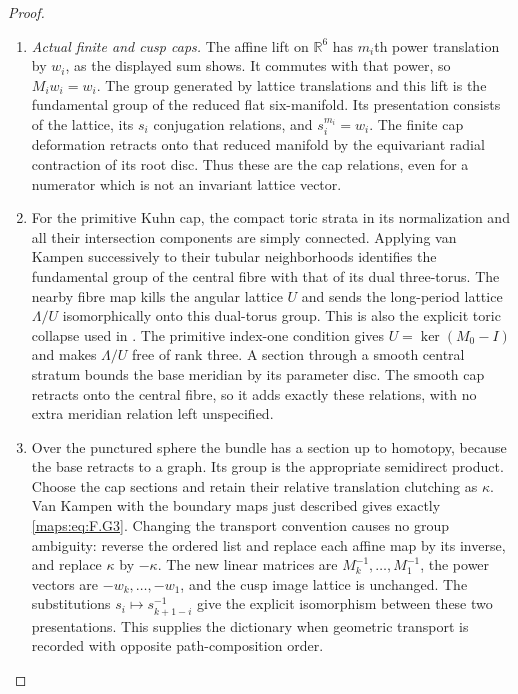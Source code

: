 \begin{proof}
\begin{enumerate}[label={$\langle1\rangle$\arabic*.}]
\item \emph{Actual finite and cusp caps.}
The affine lift on $\mathbb R^6$ has $m_i$th power translation by
$w_i$, as the displayed sum shows.  It commutes with that power,
so $M_iw_i=w_i$.  The group generated by lattice translations
and this lift is the fundamental group of the reduced flat
six-manifold.  Its presentation consists of the lattice, its
$s_i$ conjugation relations, and $s_i^{m_i}=w_i$.
The finite cap deformation retracts onto that reduced manifold
by the equivariant radial contraction of its root disc.
Thus these are the cap relations, even for a numerator
which is not an invariant lattice vector.

\item For the primitive Kuhn cap, the compact toric strata in its
normalization and all their intersection components are simply
connected.  Applying van Kampen successively to their tubular
neighborhoods identifies the fundamental group of the central
fibre with that of its dual three-torus.  The nearby fibre map
kills the angular lattice $U$ and sends the long-period lattice
$\Lambda/U$ isomorphically onto this dual-torus group.  This is
also the explicit toric collapse used in .  The primitive
index-one condition gives $U=\ker(M_0-I)$ and makes $\Lambda/U$
free of rank three.  A section through a smooth central stratum
bounds the base meridian by its parameter disc.  The smooth cap
retracts onto the central fibre, so it adds exactly these
relations, with no extra meridian relation left unspecified.

\item Over the punctured sphere the bundle has a section up to homotopy,
because the base retracts to a graph.  Its group is the appropriate
semidirect product.  Choose the cap sections and retain their
relative translation clutching as $\kappa$.  Van Kampen with the
boundary maps just described gives exactly \eqref{maps:eq:F.G3}.
Changing the transport convention causes no group ambiguity:
reverse the ordered list and replace each affine map by its
inverse, and replace $\kappa$ by $-\kappa$.  The new linear
matrices are $M_k^{-1},\ldots,M_1^{-1}$, the power vectors are
$-w_k,\ldots,-w_1$, and the cusp image lattice is unchanged.
The substitutions $s_i\mapsto s_{k+1-i}^{-1}$ give the explicit
isomorphism between these two presentations.  This supplies the
dictionary when geometric transport is recorded with opposite
path-composition order.


\end{enumerate}
\end{proof}

